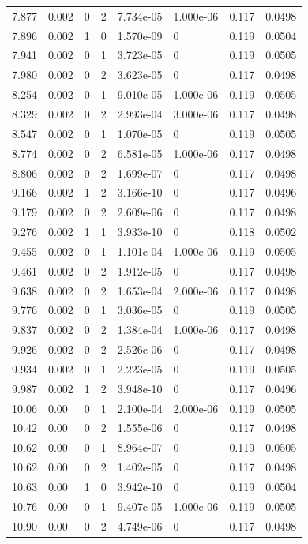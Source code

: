 \documentclass[preview]{standalone}
\begin{document}
{{{\begin{tabular}{L{1.2cm}C{1.2cm} C{0.3cm}C{0.5cm} C{1.4cm}C{1.4cm} C{1.4cm}C{1.4cm}}
  7.877  &  0.002  & 0     &  2 &  7.734e-05  & 1.000e-06  & 0.117 &  0.0498   \\ 
  7.896  &  0.002  & 1     &  0 &  1.570e-09  & 0  & 0.119 &  0.0504   \\ 
  7.941  &  0.002  & 0     &  1 &  3.723e-05  & 0  & 0.119 &  0.0505   \\ 
  7.980  &  0.002  & 0     &  2 &  3.623e-05  & 0  & 0.117 &  0.0498   \\ 
  8.254  &  0.002  & 0     &  1 &  9.010e-05  & 1.000e-06  & 0.119 &  0.0505   \\ 
  8.329  &  0.002  & 0     &  2 &  2.993e-04  & 3.000e-06  & 0.117 &  0.0498   \\ 
  8.547  &  0.002  & 0     &  1 &  1.070e-05  & 0  & 0.119 &  0.0505   \\ 
  8.774  &  0.002  & 0     &  2 &  6.581e-05  & 1.000e-06  & 0.117 &  0.0498   \\ 
  8.806  &  0.002  & 0     &  2 &  1.699e-07  & 0  & 0.117 &  0.0498   \\ 
  9.166  &  0.002  & 1     &  2 &  3.166e-10  & 0  & 0.117 &  0.0496   \\ 
  9.179  &  0.002  & 0     &  2 &  2.609e-06  & 0  & 0.117 &  0.0498   \\ 
  9.276  &  0.002  & 1     &  1 &  3.933e-10  & 0  & 0.118 &  0.0502   \\ 
  9.455  &  0.002  & 0     &  1 &  1.101e-04  & 1.000e-06  & 0.119 &  0.0505   \\ 
  9.461  &  0.002  & 0     &  2 &  1.912e-05  & 0  & 0.117 &  0.0498   \\ 
  9.638  &  0.002  & 0     &  2 &  1.653e-04  & 2.000e-06  & 0.117 &  0.0498   \\ 
  9.776  &  0.002  & 0     &  1 &  3.036e-05  & 0  & 0.119 &  0.0505   \\ 
  9.837  &  0.002  & 0     &  2 &  1.384e-04  & 1.000e-06  & 0.117 &  0.0498   \\ 
  9.926  &  0.002  & 0     &  2 &  2.526e-06  & 0  & 0.117 &  0.0498   \\ 
  9.934  &  0.002  & 0     &  1 &  2.223e-05  & 0  & 0.119 &  0.0505   \\ 
  9.987  &  0.002  & 1     &  2 &  3.948e-10  & 0  & 0.117 &  0.0496   \\ 
  10.06  &  0.00  & 0     &  1 &  2.100e-04  & 2.000e-06  & 0.119 &  0.0505   \\ 
  10.42  &  0.00  & 0     &  2 &  1.555e-06  & 0  & 0.117 &  0.0498   \\ 
  10.62  &  0.00  & 0     &  1 &  8.964e-07  & 0  & 0.119 &  0.0505   \\ 
  10.62  &  0.00  & 0     &  2 &  1.402e-05  & 0  & 0.117 &  0.0498   \\ 
  10.63  &  0.00  & 1     &  0 &  3.942e-10  & 0  & 0.119 &  0.0504   \\ 
  10.76  &  0.00  & 0     &  1 &  9.407e-05  & 1.000e-06  & 0.119 &  0.0505   \\ 
  10.90  &  0.00  & 0     &  2 &  4.749e-06  & 0  & 0.117 &  0.0498   \\ 
\hline 
\end{tabular} 

}}}
\end{document}
